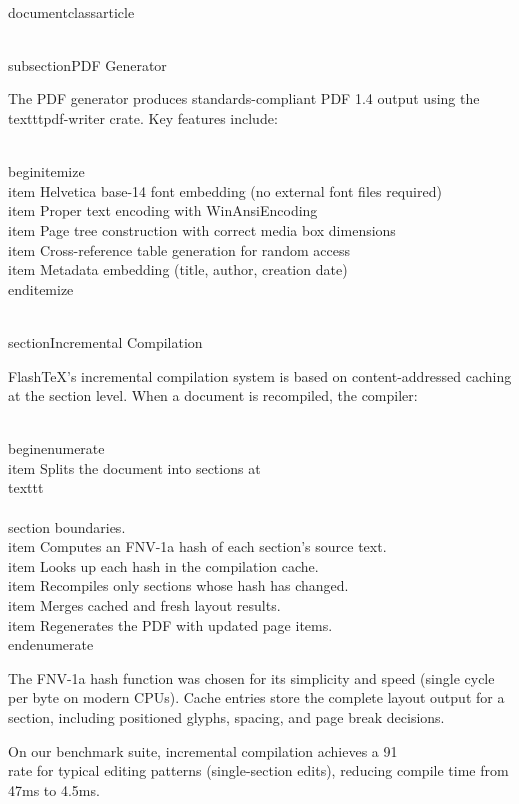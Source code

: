 \\documentclass{article}
\begin{document}
\\subsection{PDF Generator}

The PDF generator produces standards-compliant PDF 1.4 output using the
\\texttt{pdf-writer} crate. Key features include:

\\begin{itemize}
  \\item Helvetica base-14 font embedding (no external font files required)
  \\item Proper text encoding with WinAnsiEncoding
  \\item Page tree construction with correct media box dimensions
  \\item Cross-reference table generation for random access
  \\item Metadata embedding (title, author, creation date)
\\end{itemize}

\\section{Incremental Compilation}

FlashTeX's incremental compilation system is based on content-addressed
caching at the section level. When a document is recompiled, the compiler:

\\begin{enumerate}
  \\item Splits the document into sections at \\texttt{\\\\section}
    boundaries.
  \\item Computes an FNV-1a hash of each section's source text.
  \\item Looks up each hash in the compilation cache.
  \\item Recompiles only sections whose hash has changed.
  \\item Merges cached and fresh layout results.
  \\item Regenerates the PDF with updated page items.
\\end{enumerate}

The FNV-1a hash function was chosen for its simplicity and speed (single
cycle per byte on modern CPUs). Cache entries store the complete layout
output for a section, including positioned glyphs, spacing, and page
break decisions.

On our benchmark suite, incremental compilation achieves a 91\\%
rate for typical editing patterns (single-section edits), reducing compile
time from 47ms to 4.5ms.
\end{document}
